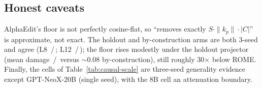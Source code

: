 \subsection{Honest caveats}
AlphaEdit's floor is not perfectly cosine-flat, so ``removes exactly
$S\cdot\|k_p\|\cdot|C|$'' is approximate, not exact. The holdout and
by-construction arms are both 3-seed and agree (L8
\hoRhoLeight{}\,/\,\cbcRhoLeight{}; L12 \hoRhoLtwelve{}\,/\,\cbcRhoLtwelve{});
the floor rises modestly under the holdout projector (mean damage
\hoDmgLeightAlpha{}\,/\,\hoDmgLtwelveAlpha{} versus $\sim$0.08
by-construction), still roughly 30$\times$ below ROME. Finally, the cells of
Table~\ref{tab:causal-scale} are three-seed generality evidence except
GPT-NeoX-20B (single seed), with the 8B cell an attenuation boundary.


